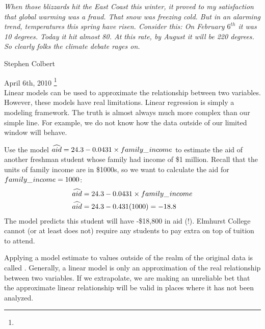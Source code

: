 
{\em\small When those blizzards hit the East Coast this winter, it proved to my satisfaction that global warming was a fraud. That snow was freezing cold. But in an alarming trend, temperatures this spring have risen. Consider this: On February $6^{th}$ it was 10 degrees. Today it hit almost 80. At this rate, by August it will be 220 degrees. So clearly folks the climate debate rages on.\vspace{0.5mm}}

\noindent\hspace{\textwidth}\hspace{-40mm}Stephen Colbert

\noindent\hspace{\textwidth}\hspace{-40mm}April 6th, 2010 \footnote{} \\

Linear models can be used to approximate the relationship between two variables. However, these models have real limitations. Linear regression is simply a modeling framework. The truth is almost always much more complex than our simple line. For example, we do not know how the data outside of our limited window will behave.

\begin{example}{Use the model $\widehat{aid} = 24.3 - 0.0431\times family\_\hspace{0.3mm}income$ to estimate the aid of another freshman student whose family had income of \$1 million.}
Recall that the units of family income are in \$1000s, so we want to calculate the aid for $family\_\hspace{0.3mm}income = 1000$:
\begin{align*}
\widehat{aid} &= 24.3 - 0.0431 \times family\_\hspace{0.3mm}income \\
\widehat{aid}&=24.3 - 0.431(1000) = -18.8
\end{align*}
The model predicts this student will have -\$18,800 in aid (!). Elmhurst College cannot (or at least does not) require any students to pay extra on top of tuition to attend.
\end{example}

Applying a model estimate to values outside of the realm of the original data is called . Generally, a linear model is only an approximation of the real relationship between two variables. If we extrapolate, we are making an unreliable bet that the approximate linear relationship will be valid in places where it has not been analyzed.

